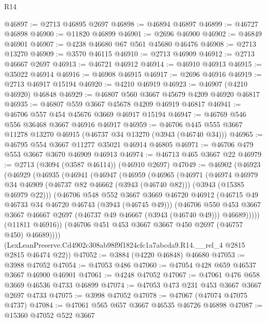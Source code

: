 \begin{lexlean}{R14}
\begin{coremodule}
@46897 := @2713 @46895 @2697
@46898 := @46894 @46897
@46899 := @46727 @46898
@46900 := @11820 @46899
@46901 := @2696 @46900
@46902 := @46849 @46901
@46907 := @4238 @46680 @67 @561 @45680 @46476
@46908 := @2713 @13270
@46909 := @3570 @46115
@46910 := @2713 @46909
@46912 := @2713 @46667 @2697
@46913 := @46721 @46912
@46914 := @46910 @46913
@46915 := @35022 @46914
@46916 := @46908 @46915
@46917 := @2696 @46916
@46919 := @2713 @46917 @15194
@46920 := @4210 @46919
@46923 := @46907 (@4210 @46920) @46848
@46929 := @46807 @560 @3667 @45679 @4209 @46920 @46817
@46935 := @46807 @559 @3667 @45678 @4209 @46919 @46817
@46941 := @46706 @557 @454 @45676 @3669 @46917 @15194
@46947 := @46769 @546 @556 @36468 @3667 @46916 @46917
@46959 := @46706 @445 @555 @3667 @11278 @13270 @46915 (@46737 @34 @13270 (@3943 (@46740 @34)))
@46965 := @46795 @554 @3667 @11277 @35021 @46914 @46805
@46971 := @46706 @479 @553 @3667 @3670 @46909 @46913
@46974 := @46713 @465 @3667 @22
@46979 := @2713 (@3094 (@3587 @46114)) (@46910 @2697)
@47049 := @46902
    (@46923
      (@46929
        (@46935
          (@46941
            (@46947
              (@46959
                (@46965
                  (@46971
                    (@46974
                      @46979
                      @34
                      @46909
                      (@46737 @82 @46662 (@3943 (@46740 @82)))
                      (@3943 (@15385 @46979 @22)))
                    (@46706
                      @548
                      @552
                      @3667
                      @3669
                      @46720
                      @46912
                      (@46715 @49 @46733 @34 @46720 @46743 (@3943 (@46745 @49)))
                      (@46706
                        @550
                        @453
                        @3667
                        @3667
                        @46667
                        @2697
                        (@46737 @49 @46667 (@3943 (@46740 @49)))
                        @46689)))))
              (@11811 @46916))
            (@46706 @451 @453 @3667 @3667 @450 @2697 (@46757 @450) @46689))))
      (LexLeanPreserve.Cd4902c308ab98f9f1824cfc1a7abcda9.R14.__rel_4 @2815 @2815 @46474 @22))
@47052 := @3884 (@4220 @46848) @46680
@47053 := @3988 @47052
@47054 := @47053 @486
@47060 := @47054 @428 @659 @46537 @3667 @46900 @46901
@47061 := @4248 @47052
@47067 := @47061 @476 @658 @3669 @46536 @4733 @46899
@47074 := @47053 @473 @231 @453 @3667 @3667 @2697 @4733
@47075 := @3998 @47052
@47078 := @47067 (@47074 @47075 @4737)
@47084 := @47061 @565 @657 @3667 @46535 @46726 @46898
@47087 := @15360 @47052 @522 @3667

\end{coremodule}
\end{lexlean}
